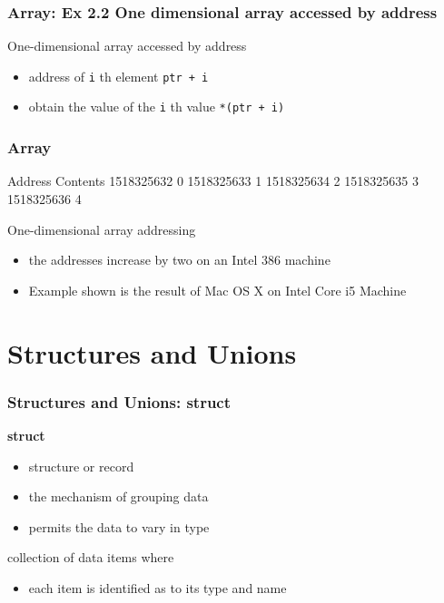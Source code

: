 \documentclass[newPxFont,sthlmFooter,nooffset]{beamer}
\begin{document}
\begin{frame}[t, fragile]
  \frametitle{Array:  Ex 2.2 One dimensional array accessed by address}



One-dimensional array accessed by address
\begin{itemize}
\item address of \texttt{i} th element \texttt{ptr + i}
\item obtain the value of the \texttt{i} th value \texttt{*(ptr + i)}
\end{itemize}

\end{frame}

\begin{frame}[t, fragile]
  \frametitle{Array}
\begin{codedefnb}
Address		Contents
1518325632	    0
1518325633	    1
1518325634	    2
1518325635	    3
1518325636	    4
\end{codedefnb}
\bigskip
One-dimensional array addressing
\begin{itemize}
\item the addresses increase by two on an Intel 386 machine
\item Example shown is the result of Mac OS X on Intel Core i5 Machine
\end{itemize}

\end{frame}


\section{Structures and Unions}

\begin{frame}[t]
  \frametitle{Structures and Unions: struct}
\textbf{struct}  
\begin{itemize}
\item structure or record
\item the mechanism of grouping data
\item permits the data to vary in type
\end{itemize}
\bigskip

collection of data items where
\begin{itemize}
\item each item is identified as to its type and name
\end{itemize}

\end{frame}
\end{document}
